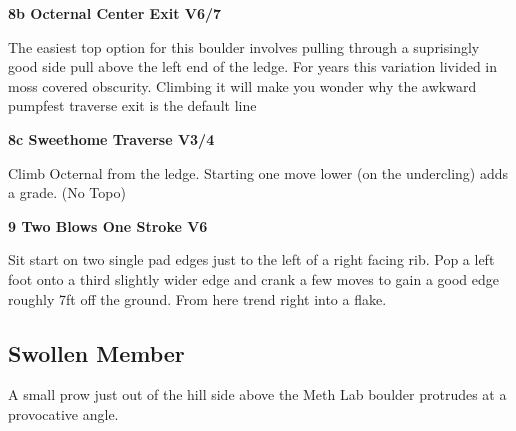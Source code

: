 \begin{multicols}{2}
\begin{adjustwidth}{0.5cm}{}
					
					
					\needspace{1.5cm}
\label{vr:Octernal Center Exit}
\colorbox{Goldenrod!50}{
\parbox{0.95\linewidth}{
\textbf{
8b Octernal Center Exit V6/7  
}}}

					\begin{adjustwidth}{0.5cm}{}			
					The easiest top option for this boulder involves pulling through a suprisingly good side pull above the left end of the ledge. For years this variation livided in moss covered obscurity. Climbing it will make you wonder why the awkward pumpfest traverse exit is the default line
					\end{adjustwidth}
					
					
					
					\needspace{1.5cm}
\label{vr:Sweethome Traverse}
\colorbox{RoyalBlue!20}{
\parbox{0.95\linewidth}{
\textbf{
8c Sweethome Traverse V3/4  
}}}

					\begin{adjustwidth}{0.5cm}{}			
					Climb Octernal from the ledge. Starting one move lower (on the undercling) adds a grade. (No Topo)
					\end{adjustwidth}
					
					
				\end{adjustwidth}
			


			\needspace{1.5cm}
\label{rt:Two Blows One Stroke}
\colorbox{RoyalBlue!20}{
\parbox{0.95\linewidth}{
\textbf{
9 Two Blows One Stroke V6  
}}}

			\begin{adjustwidth}{0.5cm}{}			
			Sit start on two single pad edges just to the left of a right facing rib. Pop a left foot onto a third  slightly wider edge and crank a few moves to gain a good edge roughly 7ft off the ground. From here trend right into a flake.
			\end{adjustwidth}
			
			
		


		\needspace{1.5cm}
		\subsection*{Swollen Member}\label{bf:Swollen Member}
		A small prow just out of the hill side above the Meth Lab boulder protrudes at a provocative angle.\\
	

\end{multicols}
